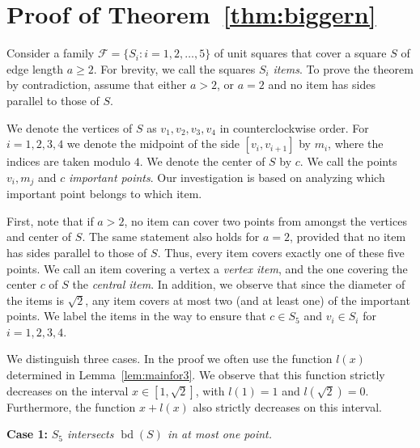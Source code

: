 \documentclass[twoside]{amsart}
\DeclareMathOperator{\bd}{bd}
\begin{document}
\section{Proof of Theorem~\ref{thm:biggern}}\label{sec:biggern}

Consider a family $\mathcal{F} = \{ S_i:i=1,2,\ldots,5\}$ of unit squares that cover a square $S$ of edge length $a \geq 2$. For brevity, we call the squares $S_i$ \emph{items}. To prove the theorem by contradiction, assume that either $a > 2$, or $a=2$ and no item has sides parallel to those of $S$.

We denote the vertices of $S$ as $v_1, v_2, v_3, v_4$ in counterclockwise order. For $i=1,2,3,4$ we denote the midpoint of the side $[v_i,v_{i+1}]$ by $m_i$, where the indices are taken modulo $4$. We denote the center of $S$ by $c$. We call the points $v_i, m_j$ and $c$ \emph{important points}. Our investigation is based on analyzing which important point belongs to which item.


First, note that if $a > 2$, no item can cover two points from amongst the vertices and center of $S$. The same statement also holds for $a=2$, provided that no item has sides parallel to those of $S$. Thus, every item covers exactly one of these five points. We call an item covering a vertex a \emph{vertex item}, and the one covering the center $c$ of $S$ the \emph{central item}. In addition, we observe that since the diameter of the items is $\sqrt{2}$, any item covers at most two (and at least one) of the important points. We label the items in the way to ensure that $c \in S_5$ and $v_i \in S_i$ for $i=1,2,3,4$.

We distinguish three cases. In the proof we often use the function $l(x)$ determined in Lemma~\ref{lem:mainfor3}. We observe that this function strictly decreases on the interval $x \in [1,\sqrt{2}]$, with $l(1)=1$ and $l(\sqrt{2})=0$. Furthermore, the function $x+l(x)$ also strictly decreases on this interval.

\smallskip

\textbf{Case 1:}
\emph{$S_5$ intersects $\bd(S)$ in at most one point.}
\end{document}
